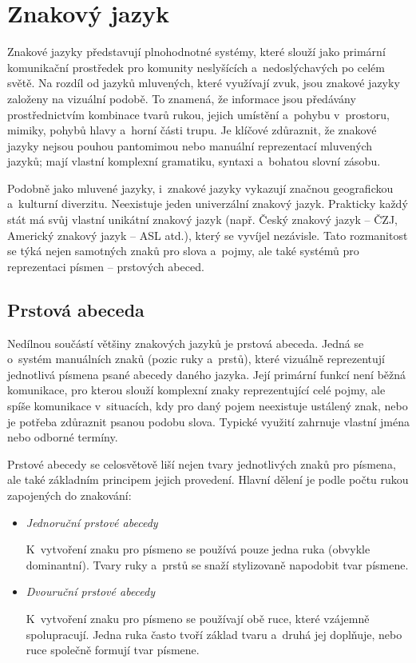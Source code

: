 \documentclass[
  master,
  program=ainfvs,
  biblatex,
  figures=true,
  tables=false,
  sourcecodes=true,
  glossaries,
  index
]{kidiplom}
\begin{document}
\clearpage

\section{Znakový jazyk}
    Znakové jazyky představují plnohodnotné systémy, které slouží jako primární komunikační prostředek pro komunity neslyšících a~nedoslýchavých po celém světě. Na rozdíl od jazyků mluvených, které využívají zvuk, jsou znakové jazyky založeny na vizuální podobě. To znamená, že informace jsou předávány prostřednictvím kombinace tvarů rukou, jejich umístění a~pohybu v~prostoru, mimiky, pohybů hlavy a~horní části trupu. Je klíčové zdůraznit, že znakové jazyky nejsou pouhou pantomimou nebo manuální reprezentací mluvených jazyků; mají vlastní komplexní gramatiku, syntaxi a~bohatou slovní zásobu.


    Podobně jako mluvené jazyky, i~znakové jazyky vykazují značnou geografickou a~kulturní diverzitu. Neexistuje jeden univerzální znakový jazyk. Prakticky každý stát má svůj vlastní unikátní znakový jazyk (např. Český znakový jazyk – ČZJ, Americký znakový jazyk – ASL atd.), který se vyvíjel nezávisle. Tato rozmanitost se týká nejen samotných znaků pro slova a~pojmy, ale také systémů pro reprezentaci písmen – prstových abeced. \cite{ruce.cz}

\subsection{Prstová abeceda}

    Nedílnou součástí většiny znakových jazyků je prstová abeceda. Jedná se o~systém manuálních znaků (pozic ruky a~prstů), které vizuálně reprezentují jednotlivá písmena psané abecedy daného jazyka. Její primární funkcí není běžná komunikace, pro kterou slouží komplexní znaky reprezentující celé pojmy, ale spíše komunikace v~situacích, kdy pro daný pojem neexistuje ustálený znak, nebo je potřeba zdůraznit psanou podobu slova. Typické využití zahrnuje vlastní jména nebo odborné termíny.

    Prstové abecedy se celosvětově liší nejen tvary jednotlivých znaků pro písmena, ale také základním principem jejich provedení. Hlavní dělení je podle počtu rukou zapojených do znakování:

    \begin{itemize}
        \item \emph{Jednoruční prstové abecedy} \par
            K~vytvoření znaku pro písmeno se používá pouze jedna ruka (obvykle dominantní). Tvary ruky a~prstů se snaží stylizovaně napodobit tvar písmene.
        \item \emph{Dvouruční prstové abecedy} \par
            K~vytvoření znaku pro písmeno se používají obě ruce, které vzájemně spolupracují. Jedna ruka často tvoří základ tvaru a~druhá jej doplňuje, nebo ruce společně formují tvar písmene.
    \end{itemize}
    
\end{document}
